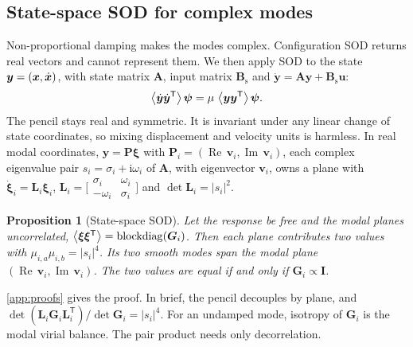 \documentclass[preprint,12pt]{elsarticle}
\newtheorem{proposition}{Proposition}
\begin{document}
\subsection{State-space SOD for complex modes}\label{sec:ssod}
Non-proportional damping makes the modes complex. Configuration SOD returns real vectors and cannot represent them.
We then apply SOD to the state $\bm{y}=(\bm{x},\dot{\bm{x}})$, with state matrix $\bm{A}$, input matrix $\bm{B}_{\mathrm s}$ and $\dot{\bm{y}}=\bm{A}\bm{y}+\bm{B}_{\mathrm s}\bm{u}$:
\begin{equation}
\left\langle \dot{\bm{y}}\dot{\bm{y}}^{\mathsf T} \right\rangle\bm{\psi}=\mu\,\left\langle \bm{y}\bm{y}^{\mathsf T} \right\rangle\bm{\psi}.
\label{eq:ssod}
\end{equation}
The pencil stays real and symmetric. It is invariant under any linear change of state coordinates, so mixing displacement and velocity units is harmless.
In real modal coordinates, $\bm{y}=\bm{P}\bm{\xi}$ with $\bm{P}_i=(\operatorname{Re}\,\bm{v}_i,\operatorname{Im}\,\bm{v}_i)$, each complex eigenvalue pair $s_i=\sigma_i+\mathrm i\omega_i$ of $\bm{A}$, with eigenvector $\bm{v}_i$, owns a plane with $\dot{\bm{\xi}}_i=\bm{L}_i\bm{\xi}_i$, $\bm{L}_i=\big[\begin{smallmatrix}\sigma_i&\omega_i\\-\omega_i&\sigma_i\end{smallmatrix}\big]$ and $\det\bm{L}_i=|s_i|^2$.

\begin{proposition}[State-space SOD]\label{prop:ssod}
Let the response be free and the modal planes uncorrelated, $\left\langle \bm{\xi}\bm{\xi}^{\mathsf T} \right\rangle=\operatorname{blockdiag}(\bm{G}_i)$. Then each plane contributes two values with $\mu_{i,a}\mu_{i,b}=|s_i|^4$. Its two smooth modes span the modal plane $(\operatorname{Re}\,\bm{v}_i,\operatorname{Im}\,\bm{v}_i)$. The two values are equal if and only if $\bm{G}_i\propto\bm{I}$.
\end{proposition}
\noindent \ref{app:proofs} gives the proof. In brief, the pencil decouples by plane, and $\det(\bm{L}_i\bm{G}_i\bm{L}_i^{\mathsf T})/\det\bm{G}_i=|s_i|^4$.
For an undamped mode, isotropy of $\bm{G}_i$ is the modal virial balance. The pair product needs only decorrelation.
\end{document}
